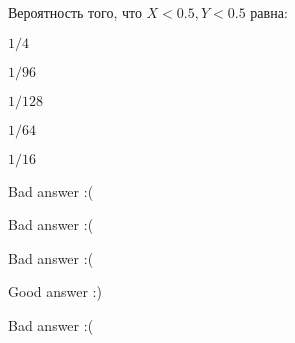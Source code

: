 
\begin{question}
Вероятность того, что \(X<0.5, Y<0.5\) равна:
\begin{answerlist}
  \item \(1/4\)
  \item \(1/96\)
  \item \(1/128\)
  \item \(1/64\)
  \item \(1/16\)
\end{answerlist}
\end{question}

\begin{solution}
\begin{answerlist}
  \item Bad answer :(
  \item Bad answer :(
  \item Bad answer :(
  \item Good answer :)
  \item Bad answer :(
\end{answerlist}
\end{solution}


